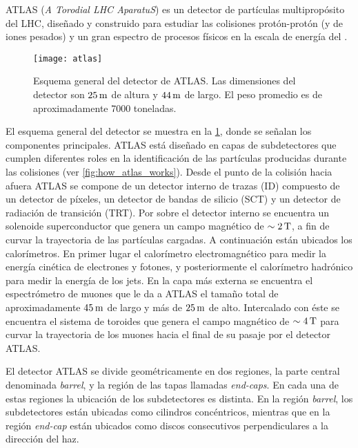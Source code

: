 ATLAS (\emph{A Torodial LHC AparatuS}) es un detector de partículas
multipropósito del LHC, diseñado y construido para estudiar las colisiones
protón-protón (y de iones pesados) y un gran espectro de procesos físicos en la
escala de energía del \tev.

\begin{figure}[!p]
  \centering

  \texttt{[image: atlas]}
  \caption{Esquema general del detector de ATLAS. Las dimensiones del detector
    son $\unit[25]{m}$ de altura y $\unit[44]{m}$ de largo. El peso promedio es
    de aproximadamente 7000 toneladas.}
  \label{fig:atlas}

\end{figure}

El esquema general del detector se muestra en la \cref{fig:atlas}, donde se
señalan los componentes principales. ATLAS está diseñado en capas de
subdetectores que cumplen diferentes roles en la identificación de las
partículas producidas durante las colisiones (ver \cref{fig:how_atlas_works}).
Desde el punto de la colisión
hacia afuera ATLAS se compone de un detector interno de trazas (ID) compuesto de
un detector de píxeles, un detector de bandas de silicio (SCT) y un detector de
radiación de transición (TRT).
Por sobre el detector interno se encuentra un
solenoide superconductor que genera un campo magnético de $\sim \unit[2]{T}$, a fin
de curvar la trayectoria de las partículas cargadas.
A continuación están ubicados los calorímetros. En primer lugar el calorímetro
electromagnético para medir la energía cinética de electrones y fotones, y
posteriormente el calorímetro hadrónico para medir la energía de los jets.
En la capa más externa se encuentra el espectrómetro de muones que le da a ATLAS
el tamaño total de aproximadamente $\unit[45]{m}$ de largo y más de
$\unit[25]{m}$ de alto. Intercalado con éste se encuentra el sistema de toroides
que genera el campo magnético de $\sim \unit[4]{T}$ para curvar la trayectoria de
los muones hacia el final de su pasaje por el detector ATLAS.

El detector ATLAS se divide geométricamente en dos regiones, la parte central
denominada \emph{barrel}, y la región de las tapas llamadas \emph{end-caps}.
En cada una de estas regiones la ubicación de los
subdetectores es distinta. En la región \emph{barrel}, los subdetectores están
ubicadas como cilindros concéntricos, mientras que en la región \emph{end-cap}
están ubicados como discos consecutivos perpendiculares a la dirección del haz.


